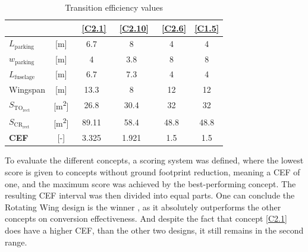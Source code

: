 \begin{table}[ht]
\caption{Transition efficiency values}
\label{tab:trans_eff}
\centering
{}
\begin{tabular}{lc|SSSS}
\toprule
                              &               & ~\textbf{\ref{C2.1}} & ~\textbf{\ref{C2.10}} & ~\textbf{\ref{C2.6}} & \textbf{\ref{C1.5}} \\ \midrule
$L_{\text{parking}}$          & [\unit{\m}]   &                6.7   &                 8     &                4     & 4                \\
$w_{\text{parking}}$          & [\unit{\m}]   &                4     &                 3.8   &                8     & 8                \\
$L_{\text{fuselage}}$         & [\unit{\m}]   &                6.7   &                 7.3   &                4     & 4                \\
Wingspan                      & [\unit{\m}]   &               13.3   &                 8     &               12   & 12             \\
$S_{\text{TO}_{\text{rect}}}$ & [\unit{\m^2}] &               26.8   &                30.4   &               32     & 32               \\
$S_{\text{CR}_{\text{rect}}}$ & [\unit{\m^2}] &               89.11  &                58.4   &               48.8   & 48.8             \\ \midrule
\textbf{CEF}                  & [\unit{-}]    &                3.325 &                 1.921 &                1.5 & 1.5            \\ \bottomrule

\end{tabular}%
\end{table}

To evaluate the different concepts, a scoring system was defined, where the lowest score is given to concepts without ground footprint reduction, meaning a CEF of one, and the maximum score was achieved by the best-performing concept.
The resulting CEF interval was then divided into equal parts.
One can conclude the Rotating Wing design is the winner , as it absolutely outperforms the other concepts on conversion effectiveness.
And despite the fact that concept \ref{C2.1} does have a higher CEF, than the other two designs, it still remains in the second range.

